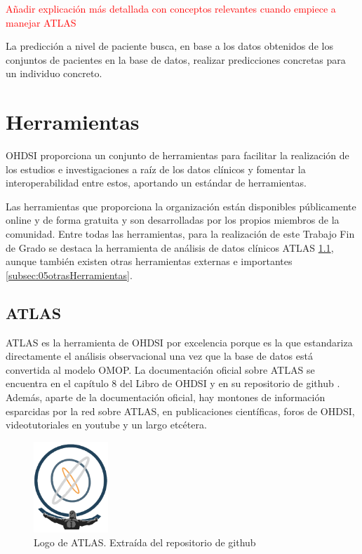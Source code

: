 \textcolor{red}{Añadir explicación más detallada con conceptos relevantes cuando empiece a manejar ATLAS}

La predicción a nivel de paciente busca, en base a los datos obtenidos de los conjuntos de pacientes en la base de datos, realizar predicciones concretas para un individuo concreto.

\section{Herramientas} \label{sec:05herramientas}

OHDSI proporciona un conjunto de herramientas para facilitar la realización de los estudios e investigaciones a raíz de los datos clínicos y fomentar la interoperabilidad entre estos, aportando un estándar de herramientas. 

Las herramientas que proporciona la organización están disponibles públicamente online y de forma gratuita y son desarrolladas por los propios miembros de la comunidad. Entre todas las herramientas, para la realización de este Trabajo Fin de Grado se destaca la herramienta de análisis de datos clínicos ATLAS \ref{subsec:05ATLAS}, aunque también existen otras herramientas externas e importantes \ref{subsec:05otrasHerramientas}.

\subsection{ATLAS} \label{subsec:05ATLAS}

ATLAS es la herramienta de OHDSI por excelencia porque es la que estandariza directamente el análisis observacional una vez que la base de datos está convertida al modelo OMOP. La documentación oficial sobre ATLAS se encuentra en el capítulo 8 del Libro de OHDSI y en su repositorio de github \cite{githubATLAS}. Además, aparte de la documentación oficial, hay montones de información esparcidas por la red sobre ATLAS, en publicaciones científicas, foros de OHDSI, videotutoriales en youtube y un largo etcétera.

\begin{figure}[H]
\centering
\includegraphics[width=0.25\textwidth]{figures/ATLASlogo.png}
     \caption{Logo de ATLAS. Extraída del repositorio de github \cite{githubATLAS}}
    \label{fig:ATLASlogo}
\end{figure}

